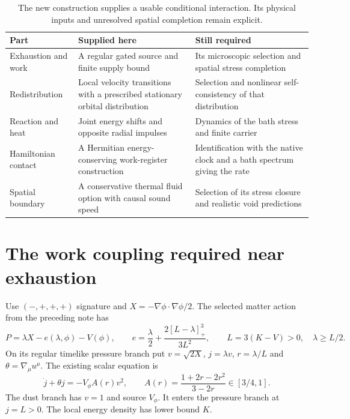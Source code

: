 \documentclass[11pt]{article}
\begin{document}
\begin{table}[ht]
\small
\begin{tabularx}{\textwidth}{@{}p{}XX@{}}
\toprule
Part & Supplied here & Still required \\
\midrule
Exhaustion and work & A regular gated source and finite supply bound &
Its microscopic selection and spatial stress completion \\
Redistribution & Local velocity transitions with a prescribed stationary
orbital distribution & Selection and nonlinear self-consistency of that distribution \\
Reaction and heat & Joint energy shifts and opposite radial impulses &
Dynamics of the bath stress and finite carrier \\
Hamiltonian contact & A Hermitian energy-conserving work-register construction &
Identification with the native clock and a bath spectrum giving the rate \\
Spatial boundary & A conservative thermal fluid option with causal sound
speed & Selection of its stress closure and realistic void predictions \\
\bottomrule
\end{tabularx}
\caption{The new construction supplies a usable conditional interaction.
Its physical inputs and unresolved spatial completion remain explicit.}
\end{table}

\section{The work coupling required near exhaustion}
Use $(-,+,+,+)$ signature and $X=-\nabla\phi\cdot\nabla\phi/2$. The selected
matter action from the preceding note has
\begin{equation}
 P=\lambda X-e(\lambda,\phi)-V(\phi),\qquad
 e=\frac{\lambda}{2}+\frac{2[L-\lambda]_+^3}{3L^2},\qquad
 L=3(K-V)>0,\quad\lambda\ge L/2.
\end{equation}
On its regular timelike pressure branch put $v=\sqrt{2X}$,
$j=\lambda v$, $r=\lambda/L$ and $\theta=\nabla_\mu u^\mu$.
The existing scalar equation is
\begin{equation}
 \dot j+\theta j=-V_\phi A(r)v^2,\qquad
 A(r)=\frac{1+2r-2r^2}{3-2r}\in[3/4,1].
\end{equation}
The dust branch has $v=1$ and source $V_\phi$. It enters the pressure branch
at $j=L>0$. The local energy density has lower bound $K$.
\end{document}

